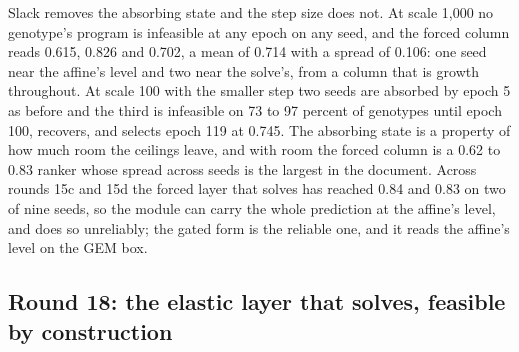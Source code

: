 Slack removes the absorbing state and the step size does not. At scale 1,000 no
genotype's program is infeasible at any epoch on any seed, and the forced column reads
0.615, 0.826 and 0.702, a mean of 0.714 with a spread of 0.106: one seed near the
affine's level and two near the solve's, from a column that is growth throughout. At
scale 100 with the smaller step two seeds are absorbed by epoch 5 as before and the
third is infeasible on 73 to 97 percent of genotypes until epoch 100, recovers, and
selects epoch 119 at 0.745. The absorbing state is a property of how much room the
ceilings leave, and with room the forced column is a 0.62 to 0.83 ranker whose spread
across seeds is the largest in the document. Across rounds 15c and 15d the forced
layer that solves has reached 0.84 and 0.83 on two of nine seeds, so the module can
carry the whole prediction at the affine's level, and does so unreliably; the gated form
is the reliable one, and it reads the affine's level on the GEM box.

\subsection{Round 18: the elastic layer that solves, feasible by construction}
\label{sec:round18}

